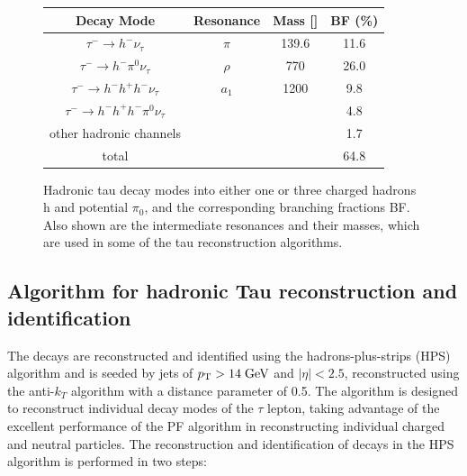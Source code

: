 \begin{figure}[tbh!]
	\begin{center}	
		\begin{tabular}{ | c | c | c | c |}
			\hline
			Decay Mode & Resonance & Mass [\mev] & BF (\%) \\ \hline
			\hline
			$\tau^{-}\longrightarrow h^{-}\nu_{\tau}$& $\pi$ & 139.6 & 11.6 \\ \hline
			$\tau^{-}\longrightarrow h^{-}\pi^{0}\nu_{\tau}$& $\rho$ & 770 & 26.0 \\ \hline
			$\tau^{-}\longrightarrow h^{-} h^{+} h^{-} \nu_{\tau}$& $a_{1}$& 1200 & 9.8 \\ \hline
			$\tau^{-}\longrightarrow h^{-} h^{+} h^{-} \pi^{0}\nu_{\tau}$& & & 4.8 \\ \hline
			other hadronic channels& & & 1.7 \\ \hline
			\hline
			total & & & 64.8 \\ \hline
			\hline
		\end{tabular}
		\caption{ Hadronic tau decay modes into either one or three charged hadrons h and potential $\pi_{0}$, and the corresponding branching fractions BF. Also shown are the intermediate resonances and their masses, which are used in some of the tau reconstruction algorithms.}
		\label{table:tau_hdecay}
	\end{center}
\end{figure}

\subsection{Algorithm for hadronic Tau reconstruction and identiﬁcation}

The \hadtau decays are reconstructed and identified using the hadrons-plus-strips (HPS) algorithm \cite{Chatrchyan:2012zz} and is seeded by jets of \ensuremath{\pt > 14 \gev} and \ensuremath{|\eta| < 2.5}, reconstructed using the anti-\ensuremath{k_{T}} algorithm \cite{antikt} with a distance parameter of 0.5. The algorithm is designed to reconstruct individual decay modes of the \ensuremath{\tau} lepton, taking advantage of the excellent performance of the PF algorithm in reconstructing individual charged and neutral particles.
The reconstruction and identification of \hadtau decays in the HPS algorithm is performed in two steps:

